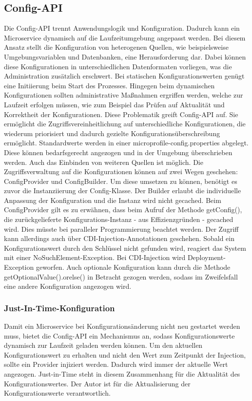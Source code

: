 \subsection{Config-API} 
Die Config-API trennt Anwendungslogik und Konfiguration. Dadurch kann ein Microservice dynamisch auf die Laufzeitumgebung angepasst werden. Bei diesem Ansatz stellt die Konfiguration von heterogenen Quellen, wie beispielsweise Umgebungsvariablen und Datenbanken, eine Herausforderung dar. Dabei können diese Konfigurationen in unterschiedlichen Datenformaten vorliegen, was die Administration zusätzlich erschwert. Bei statischen Konfigurationswerten genügt eine Initiierung beim Start des Prozesses. Hingegen beim dynamischen Konfigurationen sollten administrative Maßnahmen ergriffen werden, welche zur Laufzeit erfolgen müssen, wie zum Beispiel das Prüfen auf Aktualität und Korrektheit der Konfigurationen. 
Diese Problematik greift Config-API auf. Sie ermöglicht die Zugriffsvereinheitlichung auf unterschiedliche Konfigurationen, die wiederum priorisiert und dadurch gezielte Konfigurationsüberschreibung ermöglicht. Standardwerte werden in einer microprofile-config.properties abgelegt. Diese können bedarfsgerecht angezogen und in der Umgebung überschrieben werden. Auch das Einbinden von weiteren Quellen ist möglich.
Die Zugriffsverwaltung auf die Konfigurationen können auf zwei Wegen geschehen: ConfigProvider und ConfigBuilder. Um diese umsetzen zu können, benötigt es zuvor die Instanziierung der Config-Klasse. Der Builder erlaubt die individuelle Anpassung der Konfiguration und die Instanz wird nicht gecached. Beim ConfigProvider gilt es zu erwähnen, dass beim Aufruf der Methode getConfig(), die zurückgelieferte Konfigurations-Instanz - aus Effizienzgründen - gecached wird. Dies müsste bei paralleler Programmierung beachtet werden. Der Zugriff kann allerdings auch über CDI-Injection-Annotationen geschehen. Sobald ein Konfigurationswert durch den Schlüssel nicht gefunden wird, reagiert das System mit einer NoSuchElement-Exception. Bei CDI-Injection wird Deployment-Exception geworfen. Auch optionale Konfiguration kann durch die Methode getOptionalValue().orelse() in Betracht gezogen werden, sodass im Zweifelsfall eine andere Konfiguration angezogen wird. 

\subsubsection{Just-In-Time-Konfiguration} 
Damit ein Microservice bei Konfigurationsänderung nicht neu gestartet werden muss, bietet die Config-API ein Mechanismus an, sodass Konfigurationswerte dynamisch zur Laufzeit geladen werden können. Um den aktuellen Konfigurationswert zu erhalten und nicht den Wert zum Zeitpunkt der Injection, sollte ein Provider injiziert werden. Dadurch wird immer der aktuelle Wert angezogen. Just-in-Time steht in diesem Zusammenhang für die Aktualität des Konfigurationswertes. Der Autor ist für die Aktualisierung der Konfigurationswerte verantwortlich. 

